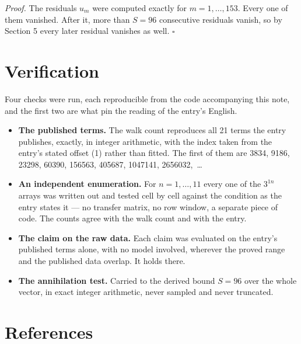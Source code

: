 \documentclass[11pt]{article}
\theoremstyle{definition}
\begin{document}
{\itshape Proof.} The residuals $u_m$ were computed exactly for $m = 1,\dots,153$. Every one of them vanished. After it, more than $S = 96$ consecutive residuals vanish, so by Section 5 every later residual vanishes as well. $\square$

\section{Verification}

Four checks were run, each reproducible from the code accompanying this note, and the first two are what pin the reading of the entry's English.

\begin{itemize}

\item {\bfseries The published terms.} The walk count reproduces all 21 terms the entry publishes, exactly, in integer arithmetic, with the index taken from the entry's stated offset (1) rather than fitted. The first of them are 3834, 9186, 23298, 60390, 156563, 405687, 1047141, 2656032,~\dots

\item {\bfseries An independent enumeration.} For $n = 1,\dots,11$ every one of the $3^{1n}$ arrays was written out and tested cell by cell against the condition as the entry states it --- no transfer matrix, no row window, a separate piece of code. The counts agree with the walk count and with the entry.

\item {\bfseries The claim on the raw data.} Each claim was evaluated on the entry's published terms alone, with no model involved, wherever the proved range and the published data overlap. It holds there.

\item {\bfseries The annihilation test.} Carried to the derived bound $S = 96$ over the whole vector, in exact integer arithmetic, never sampled and never truncated.

\end{itemize}

\section{References}
\end{document}
